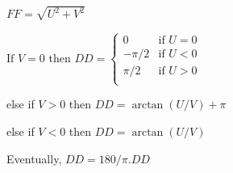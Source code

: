 $FF = \sqrt{ U^2 + V^2 } $ 

$\text{If } V=0 \text{ then } DD =
\begin{cases}
 0 & \text{if } U=0 \\
 -\pi /2 & \text{if } U < 0 \\
 \pi /2 & \text{if } U > 0 \\
\end{cases}
$

else if $V > 0$ then $DD = \arctan (U / V) + \pi$ 

else if $V < 0$ then $DD = \arctan (U / V)$  

Eventually, $DD = 180/\pi . DD$
